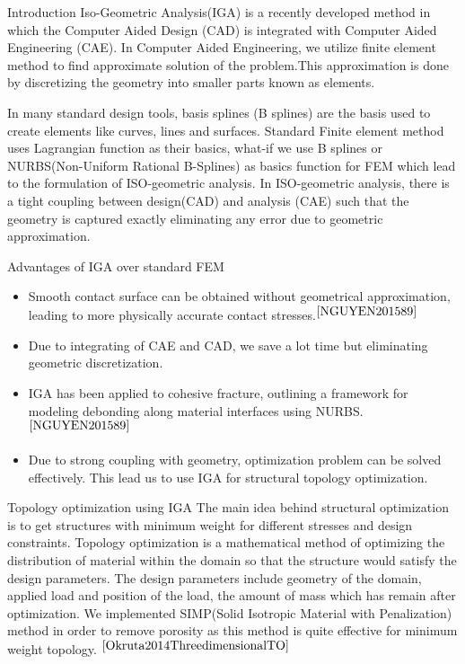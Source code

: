 \documentclass[a4paper,12pt,times]{article}
\begin{document}



\tableofcontents
\vfill
\newpage
\begin{section}{Introduction}
Iso-Geometric Analysis(IGA) is a recently developed method in which the Computer Aided Design (CAD) is integrated with Computer Aided Engineering (CAE). In Computer Aided Engineering, we utilize finite element method to find approximate solution of the problem.This approximation is done by discretizing the geometry into smaller parts known as elements.

In many standard design tools, basis splines (B splines) are the basis used to create elements like curves, lines and surfaces. Standard Finite element method uses Lagrangian function as their basics, what-if we use B splines or NURBS(Non-Uniform Rational B-Splines) as basics function for FEM which lead to the formulation of ISO-geometric analysis. In ISO-geometric analysis, there is a tight coupling between design(CAD) and analysis (CAE) such that the geometry is captured exactly eliminating any error due to geometric approximation. 

\begin{subsection}{Advantages of IGA over standard FEM}
\begin{itemize}
\item Smooth contact surface can be obtained without geometrical approximation, leading to more physically accurate contact stresses.$^{\cite{NGUYEN201589}}$
  \item Due to integrating of CAE and CAD, we save a lot time but eliminating geometric discretization.
  
  \item IGA has been applied to cohesive fracture, outlining a framework for modeling debonding along material
interfaces using NURBS.$^{\cite{NGUYEN201589}}$
  
  \item Due to strong coupling with geometry, optimization problem can be solved effectively. This lead us to use IGA for structural topology optimization.
  
\end{itemize}
\end{subsection}

\begin{subsection}{Topology optimization using IGA}
The main idea behind structural optimization is to get structures with minimum weight for different stresses and design constraints. Topology optimization is a mathematical method of optimizing the distribution of material within the domain so that the structure would satisfy the design parameters. The design parameters include geometry of the domain, applied load and position of the load, the amount of mass which has remain after optimization. We implemented SIMP(Solid Isotropic Material with Penalization) method in order to remove porosity as this method is quite effective for minimum weight topology. 
$^{\cite{Okruta2014ThreedimensionalTO}}$ 
\end{subsection}


\end{section}
\end{document}
